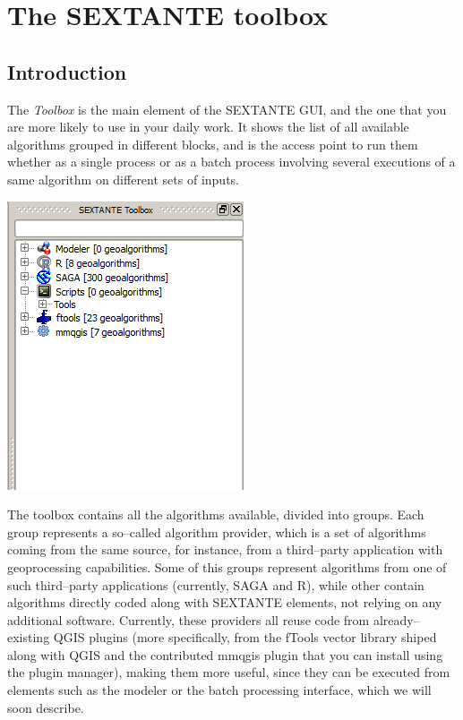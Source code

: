 \chapter{The SEXTANTE toolbox}

\section {Introduction}

The \emph{Toolbox} is the main element of the SEXTANTE GUI, and the one that you are more likely to use in your daily work. It shows the list of all available algorithms grouped in different blocks, and is the access point to run them whether as a single process or as a batch process involving several executions of a same algorithm on different sets of inputs.

\begin{center}
\includegraphics[width=.5\columnwidth]{toolbox.png}
\end{center}

The toolbox contains all the algorithms available, divided into groups. Each group represents a so--called algorithm provider, which is a set of algorithms coming from the same source, for instance, from a third--party application with geoprocessing capabilities. Some of this groups represent algorithms from one of such third--party applications (currently, SAGA and R), while other contain algorithms directly coded along with SEXTANTE elements, not relying on any additional software. Currently, these providers all reuse code from already--existing QGIS plugins (more specifically, from the fTools vector library shiped along with QGIS and the contributed mmqgis plugin that you can install using the plugin manager), making them more useful, since they can be executed from elements such as the modeler or the batch processing interface, which we will soon describe.

